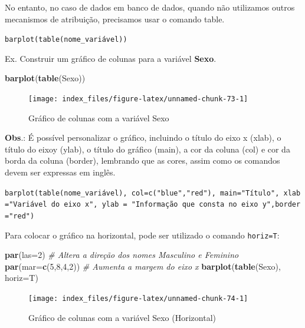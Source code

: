 \documentclass[12pt,brazil,oneside]{book}
\newenvironment{Shaded}{\begin{snugshade}}{\end{snugshade}}
\newcommand{\CommentTok}[1]{\textcolor[rgb]{0.56,0.35,0.01}{\textit{#1}}}
\newcommand{\DataTypeTok}[1]{\textcolor[rgb]{0.13,0.29,0.53}{#1}}
\newcommand{\DecValTok}[1]{\textcolor[rgb]{0.00,0.00,0.81}{#1}}
\newcommand{\KeywordTok}[1]{\textcolor[rgb]{0.13,0.29,0.53}{\textbf{#1}}}
\newcommand{\NormalTok}[1]{#1}
\begin{document}
No entanto, no caso de dados em banco de dados, quando não utilizamos outros mecanismos de atribuição, precisamos usar o comando table.

\texttt{barplot(table(nome\_variável))}

Ex. Construir um gráfico de colunas para a variável \textbf{Sexo}.

\begin{Shaded}
\begin{Highlighting}[]
\KeywordTok{barplot}\NormalTok{(}\KeywordTok{table}\NormalTok{(Sexo))}
\end{Highlighting}
\end{Shaded}

\begin{figure}[H]

{\centering \texttt{[image: index\_files/figure-latex/unnamed-chunk-73-1]} 

}

\caption{Gráfico de colunas com a variável Sexo}\label{fig:unnamed-chunk-73}
\end{figure}

\textbf{Obs}.: É possível personalizar o gráfico, incluindo o título do eixo x (xlab), o título do eixoy (ylab), o título do gráfico (main), a cor da coluna (col) e cor da borda da coluna (border), lembrando que as cores, assim como os comandos devem ser expressas em inglês.

\texttt{barplot(table(nome\_variável),\ col=c("blue","red"),\ main="Título",\ xlab="Variável\ do\ eixo\ x",\ ylab\ =\ "Informação\ que\ consta\ no\ eixo\ y",border="red")}

Para colocar o gráfico na horizontal, pode ser utilizado o comando \texttt{horiz=T}:

\begin{Shaded}
\begin{Highlighting}[]
\KeywordTok{par}\NormalTok{(}\DataTypeTok{las=}\DecValTok{2}\NormalTok{) }\CommentTok{# Altera a direção dos nomes Masculino e Feminino}
\KeywordTok{par}\NormalTok{(}\DataTypeTok{mar=}\KeywordTok{c}\NormalTok{(}\DecValTok{5}\NormalTok{,}\DecValTok{8}\NormalTok{,}\DecValTok{4}\NormalTok{,}\DecValTok{2}\NormalTok{)) }\CommentTok{# Aumenta a margem do eixo x}
\KeywordTok{barplot}\NormalTok{(}\KeywordTok{table}\NormalTok{(Sexo), }\DataTypeTok{horiz=}\NormalTok{T)}
\end{Highlighting}
\end{Shaded}

\begin{figure}[H]

{\centering \texttt{[image: index\_files/figure-latex/unnamed-chunk-74-1]} 

}

\caption{Gráfico de colunas com a variável Sexo (Horizontal)}\label{fig:unnamed-chunk-74}
\end{figure}
\end{document}
